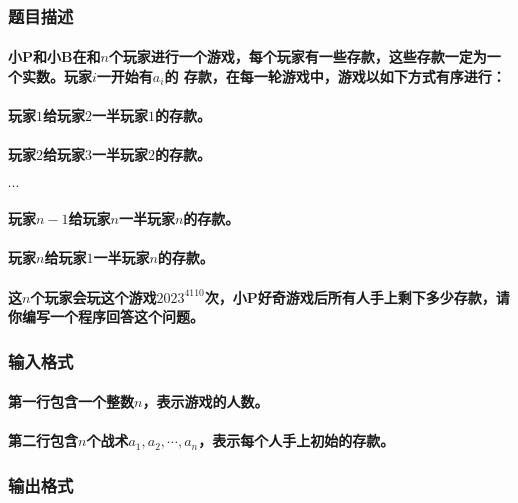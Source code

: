 \documentclass[final,11pt,oneside,UTF8]{report}
\begin{document}
\subsubsection{题目描述}
\paragraph{
    小P和小B在和$n$个玩家进行一个游戏，每个玩家有一些存款，这些存款一定为一个实数。玩家$i$一开始有$a_i$的
    存款，在每一轮游戏中，游戏以如下方式有序进行：
}
\paragraph{
    玩家$1$给玩家$2$一半玩家$1$的存款。
}
\paragraph{
    玩家$2$给玩家$3$一半玩家$2$的存款。
}
\paragraph{
    $\cdots$
}
\paragraph{
    玩家$n-1$给玩家$n$一半玩家$n$的存款。
}
\paragraph{
    玩家$n$给玩家$1$一半玩家$n$的存款。
}
\paragraph{
    这$n$个玩家会玩这个游戏$2023^{4110}$次，小P好奇游戏后所有人手上剩下多少存款，请你编写一个程序回答这个问题。
}
\subsubsection{输入格式}
\paragraph{
    第一行包含一个整数$n$，表示游戏的人数。
}
\paragraph{
    第二行包含$n$个战术$a_1,a_2,\cdots,a_n$，表示每个人手上初始的存款。
}
\subsubsection{输出格式}
\end{document}
